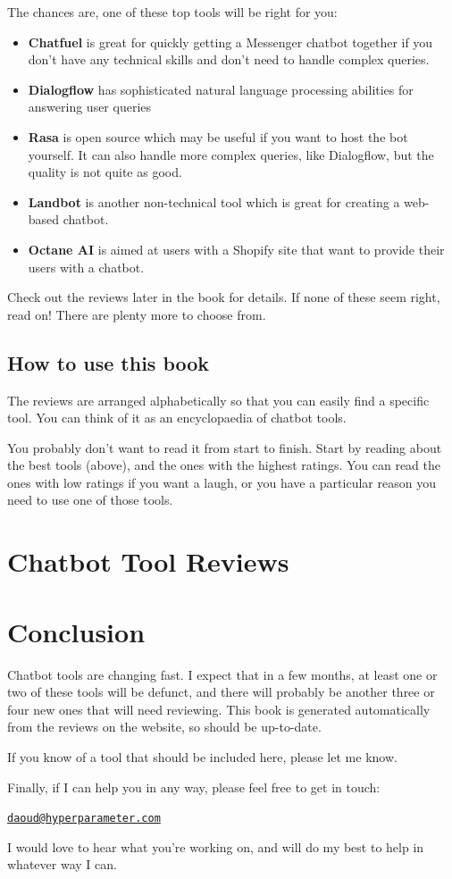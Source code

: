 \documentclass[ebook,article,11pt]{memoir}
\begin{document}
The chances are, one of these top tools will be right for you:
\begin{itemize}
\item \textbf{Chatfuel} is great for quickly getting a Messenger
  chatbot together if you don't have any technical skills and don't
  need to handle complex queries.
\item \textbf{Dialogflow} has sophisticated natural language
  processing abilities for answering user queries
\item \textbf{Rasa} is open source which may be useful if you want to
  host the bot yourself. It can also handle more complex queries, like
  Dialogflow, but the quality is not quite as good.
\item \textbf{Landbot} is another non-technical tool which is great
  for creating a web-based chatbot.
\item \textbf{Octane AI} is aimed at users with a Shopify site that
  want to provide their users with a chatbot.
\end{itemize}

Check out the reviews later in the book for details. If none of these
seem right, read on! There are plenty more to choose from.

\section*{How to use this book}

The reviews are arranged alphabetically so that you can easily find a
specific tool. You can think of it as an encyclopaedia of chatbot
tools.

You probably don't want to read it from start to finish. Start by
reading about the best tools (above), and the ones with the highest
ratings. You can read the ones with low ratings if you want a laugh,
or you have a particular reason you need to use one of those tools.

\raggedbottom
\pagebreak

\chapter{Chatbot Tool Reviews}



\chapter{Conclusion}

Chatbot tools are changing fast. I expect that in a few months, at
least one or two of these tools will be defunct, and there will
probably be another three or four new ones that will need
reviewing. This book is generated automatically from the reviews on
the website, so should be up-to-date.

If you know of a tool that should be included here, please let me
know.

Finally, if I can help you in any way, please feel free to get in
touch:
\noindent
\begin{block}
\texttt{\href{mailto:daoud@hyperparameter.com}{daoud@hyperparameter.com}}
\end{block}
I would love to hear what you're working on, and will do my best to
help in whatever way I can.
\end{document}
